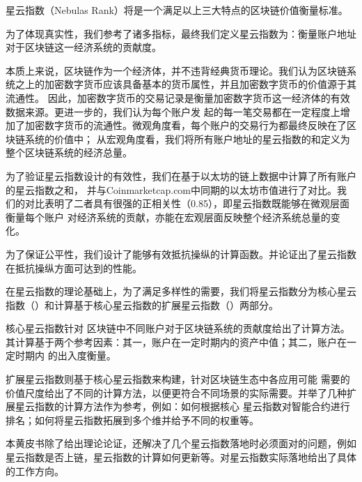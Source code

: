 星云指数（Nebulas Rank）将是一个满足以上三大特点的区块链价值衡量标准。

为了体现真实性，我们参考了诸多指标，最终我们定义星云指数为：衡量账户地址对于区块链这一经济系统的贡献度。

本质上来说，区块链作为一个经济体，并不违背经典货币理论。我们认为区块链系统之上的加密数字货币应该具备基本的货币属性，并且加密数字货币的价值源于其流通性。
因此，加密数字货币的交易记录是衡量加密数字货币这一经济体的有效数据来源。更进一步的，我们认为每个账户发
起的每一笔交易都在一定程度上增加了加密数字货币的流通性。微观角度看，每个账户的交易行为都最终反映在了区块链系统的价值中；
从宏观角度看，我们将所有账户地址的星云指数的和定义为整个区块链系统的经济总量。

为了验证星云指数设计的有效性，我们在基于以太坊的链上数据中计算了所有账户的星云指数之和，
并与Coinmarketcap.com中同期的以太坊市值进行了对比。我们的对比表明了二者具有很强的正相关性（0.85），即星云指数既能够在微观层面衡量每个账户
对经济系统的贡献，亦能在宏观层面反映整个经济系统总量的变化。

为了保证公平性，我们设计了能够有效抵抗操纵的计算函数。并论证出了星云指数在抵抗操纵方面可达到的性能。

在星云指数的理论基础上，为了满足多样性的需要，我们将星云指数分为核心星云指数（\nrcore）和计算基于核心星云指数的扩展星云指数（\nrext）两部分。

核心星云指数针对
区块链中不同账户对于区块链系统的贡献度给出了计算方法。其计算基于两个参考因素：其一，账户在一定时期内的资产中值；其二，账户在一定时期内
的出入度衡量。

扩展星云指数则基于核心星云指数来构建，针对区块链生态中各应用可能
需要的价值尺度给出了不同的计算方法，以便更符合不同场景的实际需要。并举了几种扩展星云指数的计算方法作为参考，例如：如何根据核心
星云指数对智能合约进行排名；如何将星云指数拓展到多个维并给予不同的权重等。

本黄皮书除了给出理论论证，还解决了几个星云指数落地时必须面对的问题，例如星云指数是否上链，星云指数的计算如何更新等。对星云指数实际落地给出了具体的工作方向。



